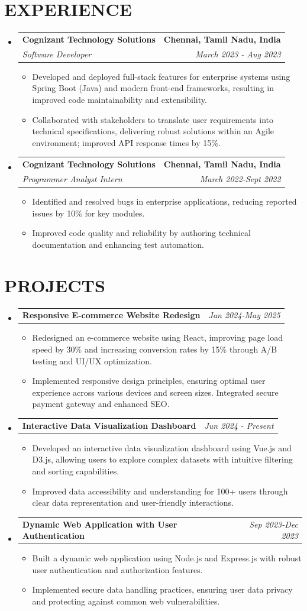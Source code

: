 \documentclass[letterpaper,11pt]{article}
\makeatletter
\newcommand{\resumeItem}[1]{\item\small{{#1 \vspace{-3pt}}}}
\newcommand{\resumeSubheading}[4]{\vspace{-2pt}\item\begin{tabular*}{0.97\textwidth}[t]{l@{\extracolsep{\fill}}r}\textbf{#1} & #2 \\\textit{\small#3} & \textit{\small #4} \\\end{tabular*}\vspace{-7pt}}
\newcommand{\resumeProjectHeading}[2]{\item\begin{tabular*}{0.97\textwidth}{l@{\extracolsep{\fill}}r}\small#1 & #2 \\\end{tabular*}\vspace{-7pt}}
\newcommand{\resumeSubHeadingListStart}{\begin{itemize}[leftmargin=0.15in, label={}]}
\newcommand{\resumeSubHeadingListEnd}{\end{itemize}}
\newcommand{\resumeItemListStart}{\begin{itemize}}
\newcommand{\resumeItemListEnd}{\end{itemize}\vspace{-5pt}}
\makeatother
\begin{document}
\section{{\fontsize{9pt}{20pt}\selectfont \textbf{EXPERIENCE}}}
\resumeSubHeadingListStart
\resumeSubheading{Cognizant Technology Solutions}{\textbf{Chennai, Tamil Nadu, India}}{Software Developer}{March 2023 - Aug 2023}
\resumeItemListStart
\resumeItem{Developed and deployed full-stack features for enterprise systems using Spring Boot (Java) and modern front-end frameworks, resulting in improved code maintainability and extensibility.}
\resumeItem{Collaborated with stakeholders to translate user requirements into technical specifications, delivering robust solutions within an Agile environment; improved API response times by 15\%.}
\resumeItemListEnd
\resumeSubheading{Cognizant Technology Solutions}{\textbf{Chennai, Tamil Nadu, India}}{Programmer Analyst Intern}{March 2022-Sept 2022}
\resumeItemListStart
\resumeItem{Identified and resolved bugs in enterprise applications, reducing reported issues by 10\% for key modules.}
\resumeItem{Improved code quality and reliability by authoring technical documentation and enhancing test automation.}
\resumeItemListEnd
\resumeSubHeadingListEnd
\vspace{-17pt}

\section{{\fontsize{9pt}{20pt}\selectfont \textbf{PROJECTS}}}
\resumeSubHeadingListStart
\resumeProjectHeading{\textbf{Responsive E-commerce Website Redesign}}{\textit{Jan 2024-May 2025}}
\resumeItemListStart
\resumeItem{Redesigned an e-commerce website using React, improving page load speed by 30\% and increasing conversion rates by 15\% through A/B testing and UI/UX optimization.}
\resumeItem{Implemented responsive design principles, ensuring optimal user experience across various devices and screen sizes.  Integrated secure payment gateway and enhanced SEO.}
\resumeItemListEnd\vspace{-6pt}
\resumeProjectHeading{\textbf{Interactive Data Visualization Dashboard}}{\textit{Jun 2024 - Present}}
\resumeItemListStart
\resumeItem{Developed an interactive data visualization dashboard using Vue.js and D3.js, allowing users to explore complex datasets with intuitive filtering and sorting capabilities.}
\resumeItem{Improved data accessibility and understanding for 100+ users through clear data representation and user-friendly interactions.}
\resumeItemListEnd\vspace{-6pt}
\resumeProjectHeading{\textbf{Dynamic Web Application with User Authentication}}{\textit{Sep 2023-Dec 2023}}
\resumeItemListStart
\resumeItem{Built a dynamic web application using Node.js and Express.js with robust user authentication and authorization features.}
\resumeItem{Implemented secure data handling practices, ensuring user data privacy and protecting against common web vulnerabilities.}
\resumeItemListEnd
\resumeSubHeadingListEnd
\vspace{-17pt}
\end{document}
